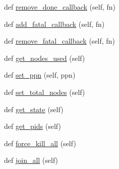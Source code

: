 \begin{DoxyCompactItemize}
\item 
def \hyperlink{classcodar_1_1savanna_1_1model_1_1_pipeline_aa1656c8b4ec886ef96521dfb137c123b}{remove\+\_\+done\+\_\+callback} (self, fn)
\item 
def \hyperlink{classcodar_1_1savanna_1_1model_1_1_pipeline_ac13dbe4331eff67d4306a11a06199e3e}{add\+\_\+fatal\+\_\+callback} (self, fn)
\item 
def \hyperlink{classcodar_1_1savanna_1_1model_1_1_pipeline_a6ddff7f98a8fd2aa7066343540c8bab0}{remove\+\_\+fatal\+\_\+callback} (self, fn)
\item 
def \hyperlink{classcodar_1_1savanna_1_1model_1_1_pipeline_a0c85356d538d06651c7ed18ceb7c1ce5}{get\+\_\+nodes\+\_\+used} (self)
\item 
def \hyperlink{classcodar_1_1savanna_1_1model_1_1_pipeline_a559b6f3f07dc06fd1c42a33fff9e96f1}{set\+\_\+ppn} (self, ppn)
\item 
def \hyperlink{classcodar_1_1savanna_1_1model_1_1_pipeline_a372fa98a663eccfd0c629e9e92f411f8}{set\+\_\+total\+\_\+nodes} (self)
\item 
def \hyperlink{classcodar_1_1savanna_1_1model_1_1_pipeline_a415914cbdd84133196a9f4c612be5313}{get\+\_\+state} (self)
\item 
def \hyperlink{classcodar_1_1savanna_1_1model_1_1_pipeline_a45f720376f4a44a4d87777c572c7dd3c}{get\+\_\+pids} (self)
\item 
def \hyperlink{classcodar_1_1savanna_1_1model_1_1_pipeline_accc64a044c6e1929d19cbea5718fd0f7}{force\+\_\+kill\+\_\+all} (self)
\item 
def \hyperlink{classcodar_1_1savanna_1_1model_1_1_pipeline_a663e76af6faf61c9791dfc925786a859}{join\+\_\+all} (self)
\end{DoxyCompactItemize}
